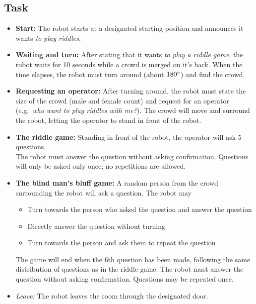 \subsection{Task}
\begin{itemize}
    \item \textbf{Start:} The robot starts at a designated starting position and announces it wants \textit{to play riddles}.

    \item \textbf{Waiting and turn:} After stating that it wants \textit{to play a riddle game}, the robot waits for 10 seconds while a crowd is merged on it's back. When the time elapses, the robot must turn around (about $180\degree$) and find the crowd.

    \item \textbf{Requesting an operator:} After turning around, the robot must state the size of the crowd (male and female count) and request for an operator (e.g.~\textit{who want to play riddles with me?}). The crowd will move and surround the robot, letting the operator to stand in front of the robot.

    \item \textbf{The riddle game:} Standing in front of the robot, the operator will ask 5 questions.\\
    The robot must answer the question without asking confirmation. Questions will only be asked only once; no repetitions are allowed. 

    \item \textbf{The blind man's bluff game:} A random person from the crowd surrounding the robot will ask a question. The robot may
    \begin{itemize}
        \item Turn towards the person who asked the question and answer the question
        \item Directly answer the question without turning
        \item Turn towards the person and ask them to repeat the question
    \end{itemize}
    The game will end when the 6th question has been made, following the same distribution of questions as in the riddle game. The robot must answer the question without asking confirmation. Questions may be repeated once.

    \item \textit{Leave:} The robot leaves the room through the designated door.
\end{itemize}

